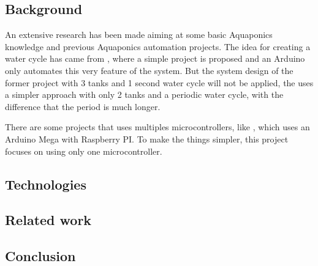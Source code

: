 \subsection{Background}

An extensive research has been made aiming at some basic Aquaponics knowledge and previous Aquaponics automation projects.
The idea for creating a water cycle has came from \cite{simpleArduinoAquaponics},
where a simple project is proposed and an Arduino only automates this very feature of the system.
But the system design of the former project with 3 tanks and 1 second water cycle will not be applied,
the \cite{Kretzinger2015} uses a simpler approach with only 2 tanks and a periodic water cycle,
with the difference that the period is much longer.

There are some projects that uses multiples microcontrollers,
like \cite{GarethColeman2014},
which uses an Arduino Mega with Raspberry PI.
To make the things simpler,
this project focuses on using only one microcontroller.

\subsection{Technologies}
\subsection{Related work}
\subsection{Conclusion}
